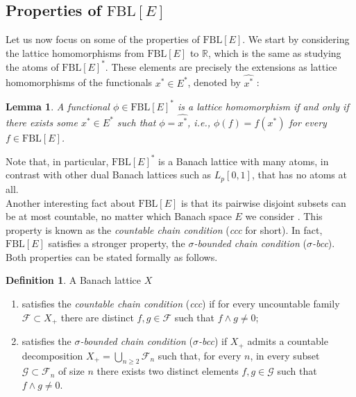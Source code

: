 \documentclass[12pt,leqno]{amsart}
\numberwithin{equation}{section} %
\newtheorem{lem}[thm]{Lemma}
\theoremstyle{definition}
\newtheorem{defn}[thm]{Definition}
\numberwithin{equation}{section}
\newcommand{\R}{\mathbb{R}}
\newcommand{\Fcal}{\mathcal{F}}
\newcommand{\Gcal}{\mathcal{G}}
\newcommand{\fbl}{\mathrm{FBL}}
\begin{document}
\subsection{Properties of $\fbl[E]$}

Let us now focus on some of the properties of $\fbl[E]$. We start by considering the lattice homomorphisms from $\fbl[E]$ to $\R$, which is the same as studying the atoms of $\fbl[E]^*$. These elements are precisely the extensions as lattice homomorphisms of the functionals $x^*\in E^*$, denoted by $\widehat{x^*}$ \cite[Corollary 2.7]{ART}:

\begin{lem}\label{lemm: atoms in FBL*}
    A functional $\phi\in \fbl[E]^*$ is a lattice homomorphism if and only if there exists some $x^*\in E^*$ such that $\phi=\widehat{x^*}$, i.e., $\phi(f)=f(x^*)$ for every $f\in\fbl[E]$.
\end{lem}

Note that, in particular, $\fbl[E]^*$ is a Banach lattice with many atoms, in contrast with other dual Banach lattices such as $L_p[0,1]$, that has no atoms at all.\\


Another interesting fact about $\fbl[E]$ is that its pairwise disjoint subsets can be at most countable, no matter which Banach space $E$ we consider \cite{APR}. This property is known as the \textit{countable chain condition} (\textit{ccc} for short). In fact, $\fbl[E]$ satisfies a stronger property, the \textit{$\sigma$-bounded chain condition} (\textit{$\sigma$-bcc}). Both properties can be stated formally as follows.

\begin{defn}\label{defi: ccc}
    A Banach lattice $X$ 
    \begin{enumerate}
        \item satisfies the \textit{countable chain condition} (\textit{ccc}) if for every uncountable family $\Fcal\subset X_+$ there are distinct $f,g\in \Fcal$ such that $f\wedge g\neq 0$;
        \item satisfies the \textit{$\sigma$-bounded chain condition} (\textit{$\sigma$-bcc}) if $X_+$ admits a countable decomposition $X_+=\bigcup_{n\geq 2} \Fcal_n$ such that, for every $n$, in every subset $\Gcal\subset \Fcal_n$ of size $n$ there exists two distinct elements $f,g\in \Gcal$ such that $f\wedge g\neq 0$.
    \end{enumerate}
\end{defn}
\end{document}
